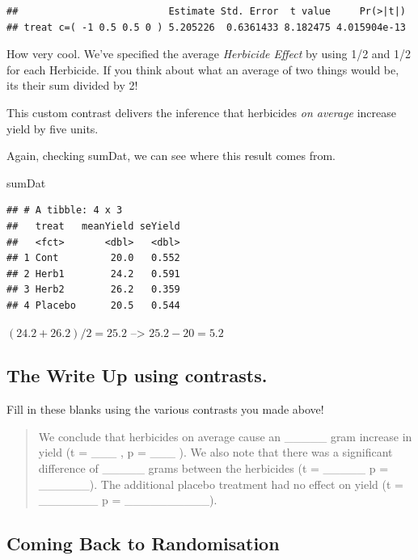 \documentclass[
]{book}
\newenvironment{Shaded}{\begin{snugshade}}{\end{snugshade}}
\newcommand{\NormalTok}[1]{#1}
\begin{document}
\begin{verbatim}
##                          Estimate Std. Error  t value     Pr(>|t|)
## treat c=( -1 0.5 0.5 0 ) 5.205226  0.6361433 8.182475 4.015904e-13
\end{verbatim}

How very cool. We've specified the average \emph{Herbicide Effect} by using 1/2 and 1/2 for each Herbicide. If you think about what an average of two things would be, its their sum divided by 2!

This custom contrast delivers the inference that herbicides \emph{on average} increase yield by five units.

Again, checking sumDat, we can see where this result comes from.

\begin{Shaded}
\begin{Highlighting}[]
\NormalTok{sumDat}
\end{Highlighting}
\end{Shaded}

\begin{verbatim}
## # A tibble: 4 x 3
##   treat   meanYield seYield
##   <fct>       <dbl>   <dbl>
## 1 Cont         20.0   0.552
## 2 Herb1        24.2   0.591
## 3 Herb2        26.2   0.359
## 4 Placebo      20.5   0.544
\end{verbatim}

\((24.2+26.2)/2 = 25.2\) --\textgreater{} \(25.2 - 20 = 5.2\)

\subsection{The Write Up using contrasts.}\label{the-write-up-using-contrasts.}

Fill in these blanks using the various contrasts you made above!

\begin{quote}
We conclude that herbicides on average cause an \_\_\_\_\_ gram increase in yield (t = \_\_\_ , p = \_\_\_ ). We also note that there was a significant difference of \_\_\_\_\_ grams between the herbicides (t = \_\_\_\_\_ p = \_\_\_\_\_\_). The additional placebo treatment had no effect on yield (t = \_\_\_\_\_\_\_ p = \_\_\_\_\_\_\_\_\_\_).
\end{quote}

\subsection{Coming Back to Randomisation}\label{coming-back-to-randomisation}
\end{document}
